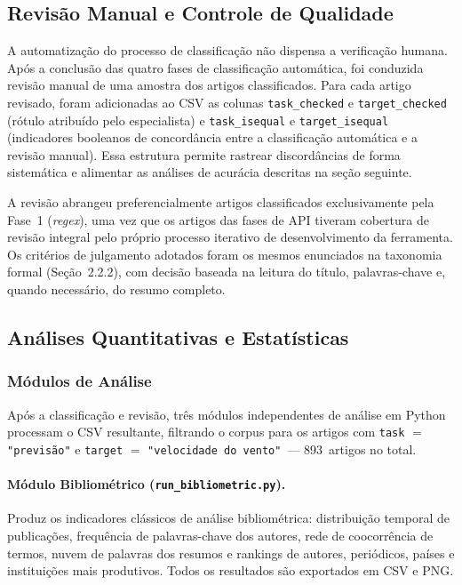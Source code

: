 \subsection{Revisão Manual e Controle de Qualidade}

A automatização do processo de classificação não dispensa a
verificação humana. Após a conclusão das quatro fases de
classificação automática, foi conduzida revisão manual de uma
amostra dos artigos classificados. Para cada artigo revisado, foram
adicionadas ao CSV as colunas \texttt{task\_checked} e
\texttt{target\_checked} (rótulo atribuído pelo especialista) e
\texttt{task\_isequal} e \texttt{target\_isequal} (indicadores
booleanos de concordância entre a classificação automática e a
revisão manual). Essa estrutura permite rastrear discordâncias de
forma sistemática e alimentar as análises de acurácia descritas na
seção seguinte.

A revisão abrangeu preferencialmente artigos classificados
exclusivamente pela Fase~1 (\textit{regex}), uma vez que os artigos
das fases de API tiveram cobertura de revisão integral pelo próprio
processo iterativo de desenvolvimento da ferramenta. Os critérios de
julgamento adotados foram os mesmos enunciados na taxonomia formal
(Seção~2.2.2), com decisão baseada na leitura do título,
palavras-chave e, quando necessário, do resumo completo.


\subsection{Análises Quantitativas e Estatísticas}

\subsubsection{Módulos de Análise}

Após a classificação e revisão, três módulos independentes de
análise em Python processam o CSV resultante, filtrando o corpus
para os artigos com \texttt{task} $=$ \texttt{"previsão"} e
\texttt{target} $=$ \texttt{"velocidade do vento"}~--- 893~artigos
no total.

\paragraph{Módulo Bibliométrico (\texttt{run\_bibliometric.py}).}
Produz os indicadores clássicos de análise bibliométrica:
distribuição temporal de publicações, frequência de palavras-chave
dos autores, rede de coocorrência de termos, nuvem de palavras dos
resumos e rankings de autores, periódicos, países e instituições
mais produtivos. Todos os resultados são exportados em CSV e PNG.

